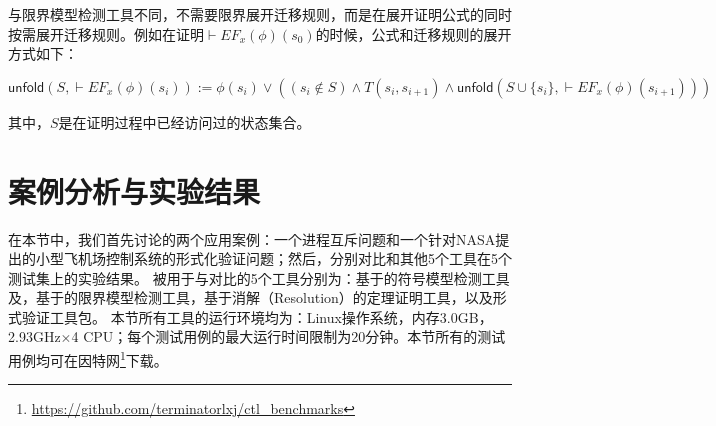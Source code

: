 与限界模型检测工具不同，\sctlprov{}不需要限界展开迁移规则，而是在展开证明公式的同时按需展开迁移规则。例如在证明$\vdash EF_x(\phi)(s_0)$的时候，公式和迁移规则的展开方式如下：

\begin{center}{\small
		$
		\textsf{unfold}(S,\vdash EF_x(\phi)(s_i)) := 
		\phi(s_i) \vee ((s_i\notin S) \wedge T(s_i, s_{i+1}) \wedge 
		\textsf{unfold}(S\cup \{s_i\},\vdash EF_x(\phi)(s_{i+1})))
		$
	}
\end{center}
其中，$S$是在证明过程中已经访问过的状态集合。


\section{案例分析与实验结果}\label{sec:case_exp}

在本节中，我们首先讨论\sctlprov{}的两个应用案例：一个进程互斥问题和一个针对NASA提出的小型飞机场控制系统的形式化验证问题；然后，分别对比\sctlprov{}和其他5个工具在5个测试集上的实验结果。
被用于与\sctlprov{}对比的5个工具分别为：基于\BDD{}的符号模型检测工具\nusmv{}及\nuxmv，基于\QBF{}的限界模型检测工具\verds{}，基于消解（Resolution）的定理证明工具，以及形式验证工具包\CADP{}。
本节所有工具的运行环境均为：Linux操作系统，内存3.0GB，2.93GHz$\times$4 CPU；每个测试用例的最大运行时间限制为20分钟。本节所有的测试用例均可在因特网\footnote{\url{https://github.com/terminatorlxj/ctl_benchmarks}}下载。


